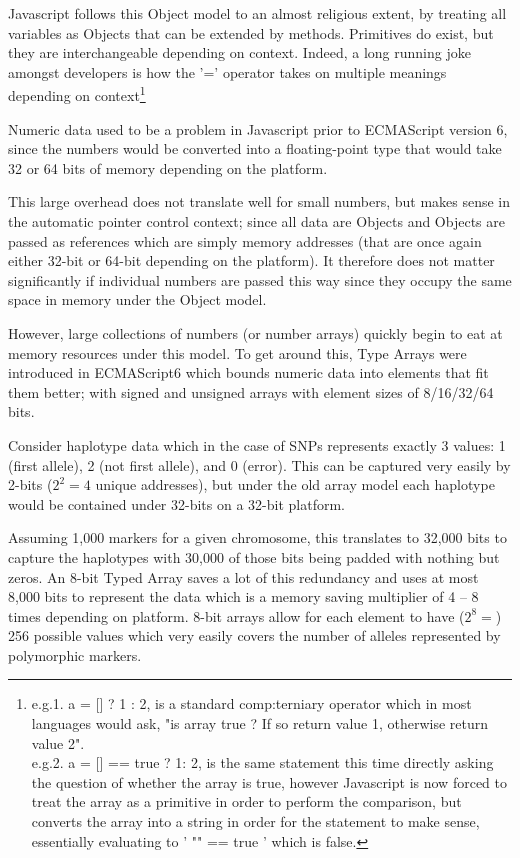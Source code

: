 Javascript follows this Object model to an almost religious extent, by treating all variables as Objects that can be extended by methods. Primitives do exist, but they are interchangeable depending on context. Indeed, a long running joke amongst developers is how the '=' operator takes on multiple meanings depending on context\footnote{

e.g.1.		a = [] ? 1 : 2, is a standard \gls{comp:terniary} operator which in most languages would ask, "is array true ? If so return value 1, otherwise return value 2".\\
e.g.2.		a = [] == true ? 1: 2,  is the same statement this time directly asking the question of whether the array is true, however Javascript is now forced to treat the array as a primitive in order to perform the comparison, but converts the array into a string in order for the statement to make sense, essentially evaluating to ' "" == true ' which is false.
}

Numeric data used to be a problem in Javascript prior to ECMAScript version 6, since the numbers would be converted into a floating-point type that would take 32 or 64 bits of memory depending on the platform. 

This large overhead does not translate well for small numbers, but makes sense in the automatic pointer control context; since all data are Objects and Objects are passed as references which are simply memory addresses (that are once again either 32-bit or 64-bit depending on the platform). It therefore does not matter significantly if individual numbers are passed this way since they occupy the same space in memory under the Object model. 

However, large collections of numbers (or number arrays) quickly begin to eat at memory resources under this model. To get around this, Type Arrays were introduced in ECMAScript6 which bounds numeric data into elements that fit them better; with signed and unsigned arrays with element sizes of 8/16/32/64 bits.

Consider haplotype data which in the case of SNPs represents exactly 3 values: 1 (first allele), 2 (not first allele), and 0 (error). This can be captured very easily by 2-bits ($2^2 = 4$ unique addresses), but under the old array model each haplotype would be contained under 32-bits on a 32-bit platform.

Assuming 1,000 markers for a given chromosome, this translates to 32,000 bits to capture the haplotypes with 30,000 of those bits being padded with nothing but zeros.  An 8-bit Typed Array saves a lot of this redundancy and uses at most 8,000 bits to represent the data which is a memory saving multiplier of 4 – 8 times depending on platform. 8-bit arrays allow for each element to have ($2^8 =$) 256 possible values which very easily covers the number of alleles represented by polymorphic markers.

